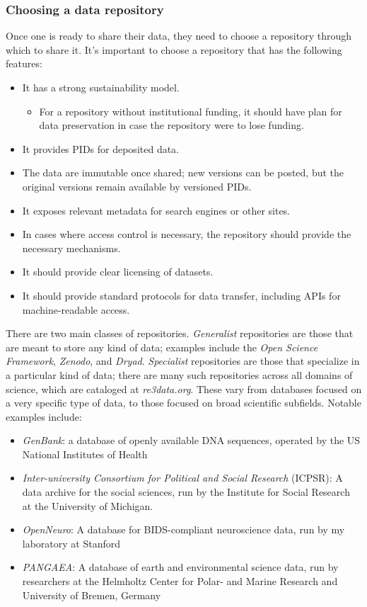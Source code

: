 \subsubsection{Choosing a data repository}

Once one is ready to share their data, they need to choose a repository through which to share it.  It's important to choose a repository that has the following features:

\begin{itemize}
\item It has a strong sustainability model.

\begin{itemize}
\item For a repository without institutional funding, it should have plan for data preservation in case the repository were to lose funding.
\end{itemize}


\item It provides PIDs for deposited data.
\item The data are immutable once shared; new versions can be posted, but the original versions remain available by versioned PIDs.
\item It exposes relevant metadata for search engines or other sites.
\item In cases where access control is necessary, the repository should provide the necessary mechanisms.
\item It should provide clear licensing of datasets.
\item It should provide standard protocols for data transfer, including APIs for machine-readable access.
\end{itemize}

There are two main classes of repositories. \textit{Generalist} repositories are those that are meant to store any kind of data; examples include the \textit{Open Science Framework}, \textit{Zenodo}, and \textit{Dryad}. \textit{Specialist} repositories are those that specialize in a particular kind of data; there are many such repositories across all domains of science, which are cataloged at \textit{re3data.org}.  These vary from databases focused on a very specific type of data, to those focused on broad scientific subfields.  Notable examples include:

\begin{itemize}
\item \textit{GenBank}: a database of openly available DNA sequences, operated by the US National Institutes of Health
\item \textit{Inter-university Consortium for Political and Social Research} (ICPSR): A data archive for the social sciences, run by the  Institute for Social Research at the University of Michigan.
\item \textit{OpenNeuro}: A database for BIDS-compliant neuroscience data, run by my laboratory at Stanford
\item \textit{PANGAEA}: A database of earth and environmental science data, run by researchers at the Helmholtz Center for Polar- and Marine Research and University of Bremen, Germany
\end{itemize}

